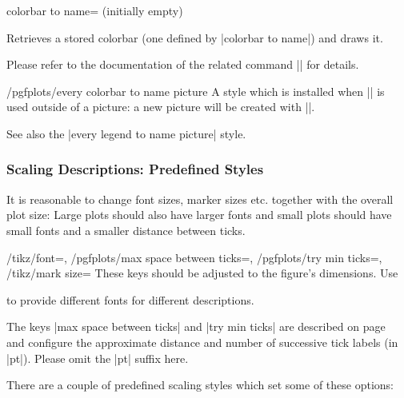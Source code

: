 \begin{pgfplotskey}{colorbar to name= (initially empty)}
	\begin{command}{\pgfplotscolorbarfromname{}}
		Retrieves a stored colorbar (one defined by |colorbar to name|) and draws it.

		Please refer to the documentation of the related command |\pgfplotslegendfromname| for details.
	\end{command}

	\begin{stylekey}{/pgfplots/every colorbar to name picture}
		A style which is installed when |\pgfplotscolorbarfromname| is used outside of a picture: a new picture will be created with ||. 
		
		See also the |every legend to name picture| style.
	\end{stylekey}
\end{pgfplotskey}

\subsubsection{Scaling Descriptions: Predefined Styles}
\label{sec:scaling:styles}
It is reasonable to change font sizes, marker sizes etc. together with the overall plot size: Large plots should also have larger fonts and small plots should have small fonts and a smaller distance between ticks.

\begin{keylist}{
	/tikz/font=,
	/pgfplots/max space between ticks=,
	/pgfplots/try min ticks=,
	/tikz/mark size=}
	These keys should be adjusted to the figure's dimensions. Use 
\begin{codeexample}
\end{codeexample}
	to provide different fonts for different descriptions.

	The keys |max space between ticks| and |try min ticks| are described on page~\pageref{maxspacebetweenticks} and configure the approximate distance and number of successive tick labels (in |pt|). Please omit the |pt| suffix here.
\end{keylist}

There are a couple of predefined scaling styles which set some of these options:

